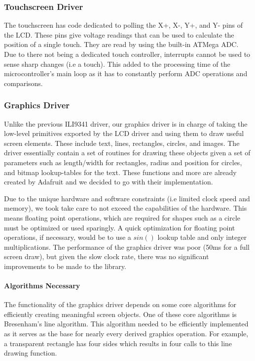 \subsubsection{Touchscreen Driver}
The touchscreen has code dedicated to polling the X+, X-, Y+, and Y- pins
of the LCD. These pins give voltage readings that can be used to calculate the
position of a single touch. They are read by using the built-in ATMega ADC.
Due to there not being a dedicated touch controller,
interrupts cannot be used to sense sharp changes (i.e a touch). This added to the
processing time of the microcontroller's main loop as it has to constantly
perform ADC operations and comparisons.

\subsubsection{Graphics Driver}
Unlike the previous ILI9341 driver, our graphics driver is in charge of
taking the low-level primitives exported by the LCD driver and using them to
draw useful screen elements. These include text, lines, rectangles, circles,
and images. The driver essentially contain a set of routines for drawing
these objects given a set of parameters such as length/width for rectangles,
radius and position for circles, and bitmap lookup-tables for the text. These
functions and more are already created by Adafruit and we decided to go with
their implementation.

Due to the unique hardware and software constraints (i.e limited clock speed
and memory), we took take care to not exceed the capabilities of the hardware.
This means floating point operations, which are required for shapes such as
a circle must be optimized or used sparingly. A quick optimization for
floating point operations, if necessary, would be to use a $sin()$ lookup table and only
integer multiplications. The performance of the graphics driver was poor
(50ms for a full screen draw), but given the slow clock rate, there was no
significant improvements to be made to the library.

\paragraph{Algorithms Necessary}
The functionality of the graphics driver depends on some core algorithms for
efficiently creating meaningful screen objects. One of these core algorithms is
Bresenham's
line algorithm.\cite{link26} This algorithm needed to be efficiently implemented as it
serves as the base for nearly every derived graphics operation. For example, a
transparent rectangle has four sides which results in four calls to this line
drawing function.


